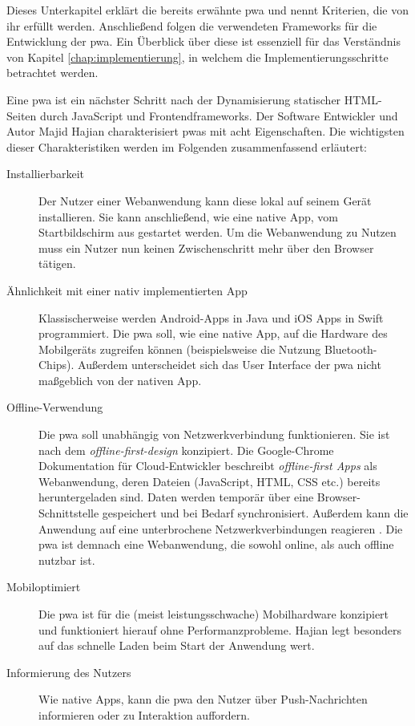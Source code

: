 Dieses Unterkapitel erklärt die bereits erwähnte \acf{pwa} und nennt Kriterien, die von ihr erfüllt werden. Anschließend folgen die verwendeten Frameworks für die Entwicklung der \ac{pwa}. Ein Überblick über diese ist essenziell für das Verständnis von Kapitel \ref{chap:implementierung}, in welchem die Implementierungsschritte betrachtet werden.

Eine \acf{pwa} ist ein nächster Schritt nach der Dynamisierung statischer HTML-Seiten durch JavaScript und Frontendframeworks. Der Software Entwickler und Autor Majid Hajian charakterisiert \ac{pwa}s mit acht Eigenschaften. Die wichtigsten dieser Charakteristiken werden im Folgenden zusammenfassend erläutert:


\begin{description}
  \item [Installierbarkeit]
	  Der Nutzer einer Webanwendung kann diese lokal auf seinem Gerät installieren. Sie kann anschließend, wie eine native App, vom Startbildschirm aus gestartet werden. Um die Webanwendung zu Nutzen muss ein Nutzer nun keinen Zwischenschritt mehr über den Browser tätigen.
  
  \item [Ähnlichkeit mit einer nativ implementierten App]  
 	 Klassischerweise werden Android-Apps in Java und iOS Apps in Swift programmiert. Die \ac{pwa} soll, wie eine native App, auf die Hardware des Mobilgeräts zugreifen können (beispielsweise die Nutzung Bluetooth-Chips). Außerdem unterscheidet sich das User Interface der \ac{pwa} nicht maßgeblich von der nativen App. 
  
  \item [Offline-Verwendung] 
  	Die \ac{pwa} soll unabhängig von Netzwerkverbindung funktionieren. Sie ist nach dem \textit{offline-first-design} konzipiert. Die Google-Chrome Dokumentation für Cloud-Entwickler beschreibt \textit{offline-first Apps} als Webanwendung, deren Dateien (JavaScript, HTML, CSS etc.) bereits heruntergeladen sind. Daten werden temporär über eine Browser-Schnittstelle gespeichert und bei Bedarf synchronisiert. Außerdem kann die Anwendung auf eine unterbrochene Netzwerkverbindungen reagieren \cite{GoogleOfflineApps}. Die \ac{pwa} ist demnach eine Webanwendung, die sowohl online, als auch offline nutzbar ist.

  \item [Mobiloptimiert]  
  	Die \ac{pwa} ist für die (meist leistungsschwache) Mobilhardware konzipiert und funktioniert hierauf ohne Performanzprobleme. Hajian legt besonders auf das schnelle Laden beim Start der Anwendung wert.
  	
  \item [Informierung des Nutzers] 
  	Wie native Apps, kann die \ac{pwa} den Nutzer über Push-Nachrichten informieren oder zu Interaktion auffordern.
\end{description}


